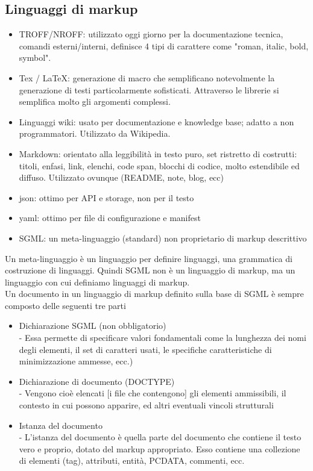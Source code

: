 \documentclass[a4paper,12pt]{article}
\begin{document}
\subsection{Linguaggi di markup}
\begin{itemize}
  \item TROFF/NROFF: utilizzato oggi giorno per la documentazione tecnica, comandi esterni/interni, definisce 4 tipi di carattere come "roman, italic, bold, symbol". 
  \item Tex / LaTeX: generazione di macro che semplificano notevolmente la generazione di testi particolarmente sofisticati. Attraverso le librerie si semplifica molto gli argomenti complessi.
  \item Linguaggi wiki: usato per documentazione e knowledge base; adatto a non programmatori. Utilizzato da Wikipedia. 
  \item Markdown: orientato alla leggibilità in testo puro, set ristretto di costrutti: titoli, enfasi, link, elenchi, code span, blocchi di codice, molto estendibile ed diffuso. Utilizzato ovunque (README, note, blog, ecc)
  \item json: ottimo per API e storage, non per il testo
  \item yaml: ottimo per file di configurazione e manifest
  \item SGML: un meta-linguaggio (standard) non proprietario di markup descrittivo
\end{itemize}
Un meta-linguaggio è un linguaggio per definire linguaggi, una grammatica di costruzione di linguaggi. Quindi SGML non è un linguaggio di markup, ma un linguaggio con cui definiamo linguaggi di markup. \\
Un documento in un linguaggio di markup definito sulla base di SGML è sempre composto delle seguenti tre parti
\begin{itemize}
  \item Dichiarazione SGML (non obbligatorio) \\
  - Essa permette di specificare valori fondamentali come la lunghezza dei nomi degli elementi, il set di caratteri usati, le specifiche caratteristiche di minimizzazione ammesse, ecc.)
  \item Dichiarazione di documento (DOCTYPE) \\
  - Vengono cioè elencati [i file che contengono] gli elementi ammissibili, il contesto in cui possono apparire, ed altri eventuali vincoli strutturali
  \item Istanza del documento \\
  - L’istanza del documento è quella parte del documento che contiene il testo vero e proprio, dotato del markup appropriato. Esso contiene una collezione di elementi (tag), attributi, entità, PCDATA, commenti, ecc.
\end{itemize}
\end{document}
